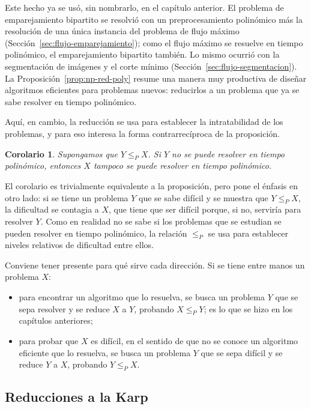 \documentclass[12pt, spanish, oneside, openany]{book}
\newcommand{\redp}{\le_{P}}
\theoremstyle{uprightplain}
\newtheorem{corolario}[teorema]{Corolario}
\theoremstyle{definition}
\theoremstyle{remark}
\theoremstyle{definition}
\begin{document}
Este hecho ya se usó, sin nombrarlo, en el capítulo anterior. El problema de emparejamiento bipartito se resolvió con un preprocesamiento polinómico más la resolución de una única instancia del problema de flujo máximo (Sección~\ref{sec:flujo-emparejamiento}); como el flujo máximo se resuelve en tiempo polinómico, el emparejamiento bipartito también. Lo mismo ocurrió con la segmentación de imágenes y el corte mínimo (Sección~\ref{sec:flujo-segmentacion}). La Proposición~\ref{prop:np-red-poly} resume una manera muy productiva de diseñar algoritmos eficientes para problemas nuevos: reducirlos a un problema que ya se sabe resolver en tiempo polinómico.

Aquí, en cambio, la reducción se usa para establecer la intratabilidad de los problemas, y para eso interesa la forma contrarrecíproca de la proposición.

\begin{corolario}
\label{cor:np-red-dificil}
Supongamos que $Y\redp X$. Si $Y$ no se puede resolver en tiempo polinómico, entonces $X$ tampoco se puede resolver en tiempo polinómico.
\end{corolario}

El corolario es trivialmente equivalente a la proposición, pero pone el énfasis en otro lado: si se tiene un problema $Y$ que se sabe difícil y se muestra que $Y\redp X$, la dificultad se contagia a $X$, que tiene que ser difícil porque, si no, serviría para resolver $Y$. Como en realidad no se sabe si los problemas que se estudian se pueden resolver en tiempo polinómico, la relación $\redp$ se usa para establecer niveles relativos de dificultad entre ellos.

Conviene tener presente para qué sirve cada dirección. Si se tiene entre manos un problema $X$:
\begin{itemize}
    \item para encontrar un algoritmo que lo resuelva, se busca un problema $Y$ que se sepa resolver y se reduce $X$ a $Y$, probando $X\redp Y$; es lo que se hizo en los capítulos anteriores;
    \item para probar que $X$ es difícil, en el sentido de que no se conoce un algoritmo eficiente que lo resuelva, se busca un problema $Y$ que se sepa difícil y se reduce $Y$ a $X$, probando $Y\redp X$.
\end{itemize}

\subsection{Reducciones a la Karp}
\label{subsec:np-karp}
\end{document}
